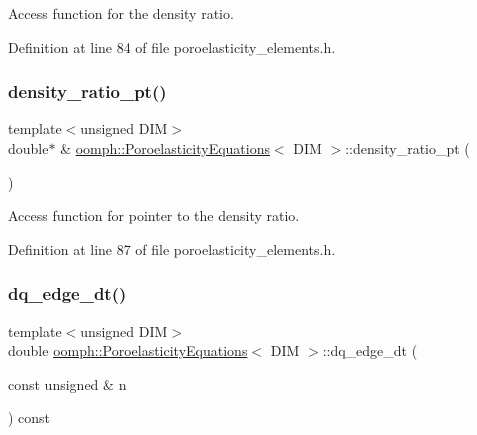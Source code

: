 Access function for the density ratio. 



Definition at line 84 of file poroelasticity\+\_\+elements.\+h.

\mbox{\label{classoomph_1_1PoroelasticityEquations_aa9390a0dea4c4d791dac49f1b2a59de9}} 
\subsubsection{\texorpdfstring{density\+\_\+ratio\+\_\+pt()}{density\_ratio\_pt()}}
{\footnotesize\ttfamily template$<$unsigned D\+IM$>$ \\
double$\ast$ \& \hyperlink{classoomph_1_1PoroelasticityEquations}{oomph\+::\+Poroelasticity\+Equations}$<$ D\+IM $>$\+::density\+\_\+ratio\+\_\+pt (\begin{DoxyParamCaption}{ }\end{DoxyParamCaption})\hspace{0.3cm}{\ttfamily [inline]}}



Access function for pointer to the density ratio. 



Definition at line 87 of file poroelasticity\+\_\+elements.\+h.

\mbox{\label{classoomph_1_1PoroelasticityEquations_a571ce9f5c356d617eca9b2d875609c46}} 
\subsubsection{\texorpdfstring{dq\+\_\+edge\+\_\+dt()}{dq\_edge\_dt()}}
{\footnotesize\ttfamily template$<$unsigned D\+IM$>$ \\
double \hyperlink{classoomph_1_1PoroelasticityEquations}{oomph\+::\+Poroelasticity\+Equations}$<$ D\+IM $>$\+::dq\+\_\+edge\+\_\+dt (\begin{DoxyParamCaption}\item[{const unsigned \&}]{n }\end{DoxyParamCaption}) const\hspace{0.3cm}{\ttfamily [inline]}}



